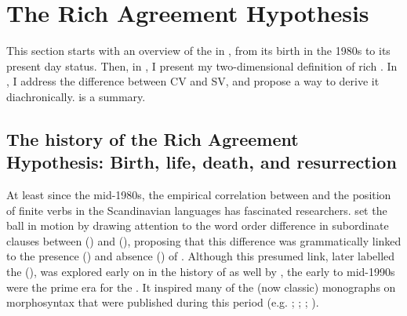 \documentclass[output=paper,colorlinks,citecolor=brown,draft,draftmode]{langscibook}
\begin{document}
\section{The Rich Agreement Hypothesis }\label{sec:petzell:4}


This section starts with an overview of the  in , from its birth in the 1980s to its present day status. Then, in , I present my two-dimensional definition of rich . In , I address the difference between CV and SV, and propose a way to derive it diachronically.  is a summary.


\subsection{The history of the Rich Agreement Hypothesis: Birth, life, death, and resurrection}\label{sec:petzell:4.1}
\begin{sloppypar}
At least since the mid-1980s, the empirical correlation between  and the position of finite verbs in the Scandinavian languages has fascinated researchers. \citet{Kosmeijer1986} set the ball in motion by drawing attention to the word order difference in subordinate clauses between  () and  (), proposing that this difference was grammatically linked to the presence () and absence () of . Although this presumed link, later labelled the  (), was explored early on in the history of  as well by \citet{Platzack1988emergence}, the early to mid-1990s were the prime era for the . It inspired many of the (now classic) monographs on  morphosyntax that were published during this period (e.g. \citealt{Falk1993}; \citealt{Rohrbacher1994}; \citealt{Vikner1994}; \citealt{HolmbergPlatzack1995}). 
\end{sloppypar}
\end{document}
